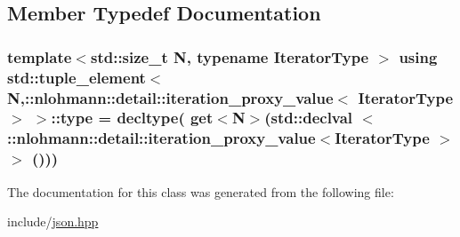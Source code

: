 \subsection{Member Typedef Documentation}
\subsubsection[{\texorpdfstring{type}{type}}]{\setlength{\rightskip}{0pt plus 5cm}template$<$std\+::size\+\_\+t N, typename Iterator\+Type $>$ using std\+::tuple\+\_\+element$<$ N,\+::{\bf nlohmann\+::detail\+::iteration\+\_\+proxy\+\_\+value}$<$ Iterator\+Type $>$ $>$\+::{\bf type} =  decltype( get$<$N$>$(std\+::declval $<$ \+::{\bf nlohmann\+::detail\+::iteration\+\_\+proxy\+\_\+value}$<$Iterator\+Type $>$$>$ ()))}\hypertarget{classstd_1_1tuple__element_3_01N_00_1_1nlohmann_1_1detail_1_1iteration__proxy__value_3_01IteratorType_01_4_01_4_a9469c97fd711b823af47c1ff75a09ada}{}\label{classstd_1_1tuple__element_3_01N_00_1_1nlohmann_1_1detail_1_1iteration__proxy__value_3_01IteratorType_01_4_01_4_a9469c97fd711b823af47c1ff75a09ada}


The documentation for this class was generated from the following file\+:\begin{DoxyCompactItemize}
\item 
include/\hyperlink{json_8hpp}{json.\+hpp}\end{DoxyCompactItemize}
